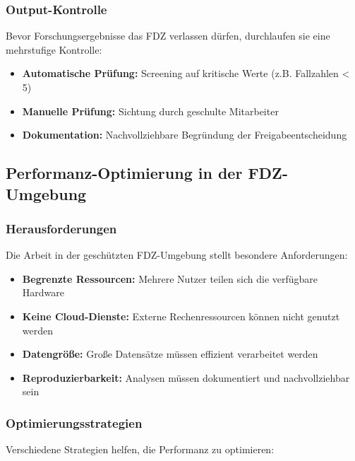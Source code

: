 \documentclass[
  ngerman,
  10pt,
  twocolumn]{article}
\providecommand{\tightlist}{%
  \setlength{\itemsep}{0pt}\setlength{\parskip}{0pt}}
\begin{document}
\subsubsection{Output-Kontrolle}\label{output-kontrolle}

Bevor Forschungsergebnisse das FDZ verlassen dürfen, durchlaufen sie
eine mehrstufige Kontrolle:

\begin{itemize}
\tightlist
\item
  \textbf{Automatische Prüfung:} Screening auf kritische Werte (z.B.
  Fallzahlen \textless{} 5)
\item
  \textbf{Manuelle Prüfung:} Sichtung durch geschulte Mitarbeiter
\item
  \textbf{Dokumentation:} Nachvollziehbare Begründung der
  Freigabeentscheidung
\end{itemize}

\subsection{Performanz-Optimierung in der
FDZ-Umgebung}\label{performanz-optimierung-in-der-fdz-umgebung}

\subsubsection{Herausforderungen}\label{herausforderungen}

Die Arbeit in der geschützten FDZ-Umgebung stellt besondere
Anforderungen:

\begin{itemize}
\tightlist
\item
  \textbf{Begrenzte Ressourcen:} Mehrere Nutzer teilen sich die
  verfügbare Hardware
\item
  \textbf{Keine Cloud-Dienste:} Externe Rechenressourcen können nicht
  genutzt werden
\item
  \textbf{Datengröße:} Große Datensätze müssen effizient verarbeitet
  werden
\item
  \textbf{Reproduzierbarkeit:} Analysen müssen dokumentiert und
  nachvollziehbar sein
\end{itemize}

\subsubsection{Optimierungsstrategien}\label{optimierungsstrategien}

Verschiedene Strategien helfen, die Performanz zu optimieren:
\end{document}
